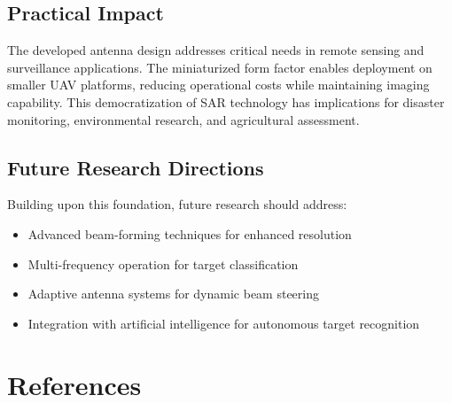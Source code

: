\documentclass[12pt]{article}
\begin{document}
\subsection{Practical Impact}

The developed antenna design addresses critical needs in remote sensing and surveillance applications. The miniaturized form factor enables deployment on smaller UAV platforms, reducing operational costs while maintaining imaging capability. This democratization of SAR technology has implications for disaster monitoring, environmental research, and agricultural assessment.

\subsection{Future Research Directions}

Building upon this foundation, future research should address:
\begin{itemize}
    \item Advanced beam-forming techniques for enhanced resolution
    \item Multi-frequency operation for target classification
    \item Adaptive antenna systems for dynamic beam steering
    \item Integration with artificial intelligence for autonomous target recognition
\end{itemize}

\newpage

\section{References}
\end{document}
